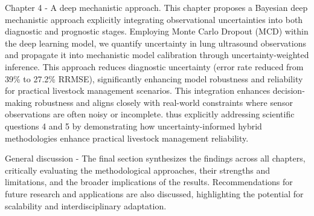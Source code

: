 Chapter 4 - A deep mechanistic approach.  This chapter proposes a Bayesian deep mechanistic approach explicitly integrating observational uncertainties into both diagnostic and prognostic stages. Employing Monte Carlo Dropout (MCD) within the deep learning model, we quantify uncertainty in lung ultrasound observations and propagate it into mechanistic model calibration through uncertainty-weighted inference. This approach reduces diagnostic uncertainty (error rate reduced from 39\% to 27.2\% RRMSE), significantly enhancing model robustness and reliability for practical livestock management scenarios. This integration enhances decision-making robustness and aligns closely with real-world constraints where sensor observations are often noisy or incomplete. thus explicitly addressing scientific questions 4 and 5 by demonstrating how uncertainty-informed hybrid methodologies enhance practical livestock management reliability.

General discussion - The final section synthesizes the findings across all chapters, critically evaluating the methodological approaches, their strengths and limitations, and the broader implications of the results. Recommendations for future research and applications are also discussed, highlighting the potential for scalability and interdisciplinary adaptation.


